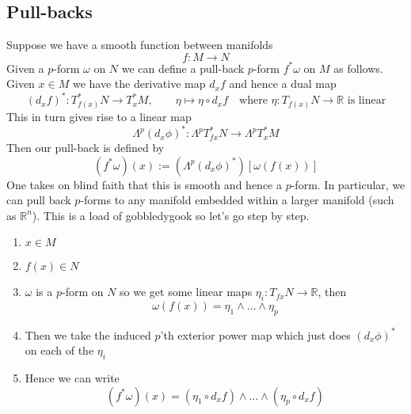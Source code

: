 \documentclass[11pt]{article}
\newcommand{\defeq}{:=}
\newcommand{\R}{\mathbb{R}}
\newcommand{\Lp}{\Lambda^p}
\newcommand{\mdf}[1]{{\color{red} #1}}
\begin{document}
\subsection{Pull-backs}
Suppose we have a smooth function between manifolds
\[
f:M \to N
\]
Given a $p$-form $\omega$ on $N$ we can define a \mdf{pull-back $p$-form $f^\ast\omega$} on $M$ as follows. 
Given $x\in M$ we have the derivative map $d_xf$ and hence a dual map
\[
	(d_x f)^\ast : T^\ast_{f(x)}N \to T^\ast_x M , \quad \quad \eta \mapsto \eta \circ d_xf \quad \text{where }\eta:T_{f(x)}N \to \R\text{ is linear}
\]
This in turn gives rise to a linear map
\[
	\Lp(d_x\phi)^\ast : \Lambda^pT_{fx}^\ast N \to \Lp T_x^\ast M
\]
Then our pull-back is defined by
\[
	(f^\ast\omega)(x) \defeq (\Lp(d_x\phi)^\ast)\left[\omega(f(x))\right]
\]
One takes on blind faith that this is smooth and hence a $p$-form.
In particular, we can pull back $p$-forms to any manifold embedded within a larger manifold (such as $\R^n$).
This is a load of gobbledygook so let's go step by step.
\begin{enumerate}
	\item $x\in M$
	\item $f(x)\in N$
	\item $\omega$ is a $p$-form on $N$ so we get some linear maps $\eta_i:T_{fx}N\to\R$, then
		\[
			\omega(f(x))=\eta_1 \wedge \dots \wedge \eta_p
		\]
	\item Then we take the induced $p$'th exterior power map which just does $(d_x\phi)^\ast$ on each of the $\eta_i$
	\item Hence we can write
		\[
			(f^\ast\omega)(x) = (\eta_1 \circ d_xf) \wedge \dots \wedge (\eta_p \circ d_xf)
		\]
\end{enumerate}
\end{document}

